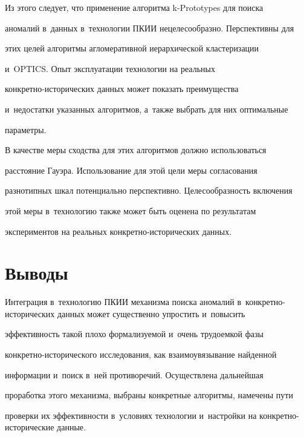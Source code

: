   


  Из этого следует, что применение алгоритма k-Prototypes для поиска 


аномалий в~данных в~технологии ПКИИ нецелесообразно. Перспективны для 


этих целей алгоритмы агломеративной иерархической кластеризации 


и~OPTICS. Опыт эксплуатации технологии на реальных  


кон\-крет\-но-ис\-то\-ри\-че\-ских данных может показать преимущества 


и~недостатки указанных алгоритмов, а~также выбрать для них оптимальные 


параметры.


  


  В качестве меры сходства для этих алгоритмов должно использоваться 


расстояние Гауэра. Использование для этой цели меры согласования 


разнотипных шкал потенциально перспективно. Целесообразность включения 


этой меры в~технологию также может быть оценена по результатам 


экспериментов на реальных кон\-крет\-но-ис\-то\-ри\-че\-ских данных.


  


\section{Выводы}


  


  Интеграция в~технологию ПКИИ механизма поиска аномалий в~кон\-крет\-но-ис\-то\-ри\-че\-ских данных может существенно упростить и~повысить 


эффективность такой плохо формализуемой и~очень трудоемкой фазы 


конкретно-исторического исследования, как взаимоувязывание найденной 


информации и~поиск в~ней противоречий. Осуществлена дальнейшая 


проработка этого механизма, выбраны конкретные алгоритмы, намечены пути 


проверки их эффективности в~условиях технологии и~настройки на кон\-крет\-но-ис\-то\-ри\-че\-ские данные.


  


